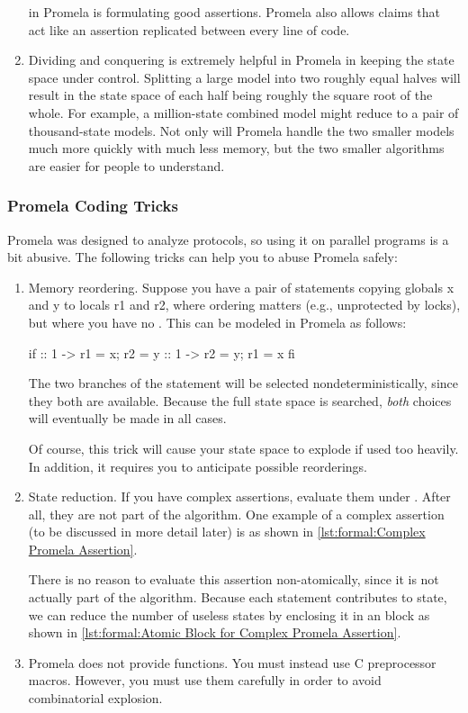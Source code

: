 \begin{enumerate}
	in Promela is formulating good assertions.
	Promela also allows  claims that act like an assertion
	replicated between every line of code.
\item	Dividing and conquering is extremely helpful in Promela in keeping
	the state space under control.
	Splitting a large model into two roughly equal halves will result
	in the state space of each half being roughly the square root of
	the whole.
	For example, a million-state combined model might reduce to a
	pair of thousand-state models.
	Not only will Promela handle the two smaller models much more
	quickly with much less memory, but the two smaller algorithms
	are easier for people to understand.
\end{enumerate}


\subsubsection{Promela Coding Tricks}
\label{sec:formal:Promela Coding Tricks}

Promela was designed to analyze protocols, so using it on parallel programs
is a bit abusive.
The following tricks can help you to abuse Promela safely:

\begin{enumerate}
\item	Memory reordering.
	Suppose you have a pair of statements copying globals x and y
	to locals r1 and r2, where ordering matters (e.g., unprotected
	by locks), but where you have no .
	This can be modeled in Promela as follows:

\begin{VerbatimN}[samepage=true]
if
:: 1 -> r1 = x;
        r2 = y
:: 1 -> r2 = y;
        r1 = x
fi
\end{VerbatimN}

	The two branches of the  statement will be selected
	nondeterministically, since they both are available.
	Because the full state space is searched, \emph{both} choices
	will eventually be made in all cases.

	Of course, this trick will cause your state space to explode
	if used too heavily.
	In addition, it requires you to anticipate possible reorderings.

\item	State reduction.
	If you have complex assertions, evaluate them under .
	After all, they are not part of the algorithm.
	One example of a complex assertion (to be discussed in more
	detail later) is as shown in
	\cref{lst:formal:Complex Promela Assertion}.

	There is no reason to evaluate this assertion
	non-atomically, since it is not actually part of the algorithm.
	Because each statement contributes to state, we can reduce
	the number of useless states by enclosing it in an 
	block as shown in
	\cref{lst:formal:Atomic Block for Complex Promela Assertion}.

\item	Promela does not provide functions.
	You must instead use C preprocessor macros.
	However, you must use them carefully in order to avoid
	combinatorial explosion.
\end{enumerate}

